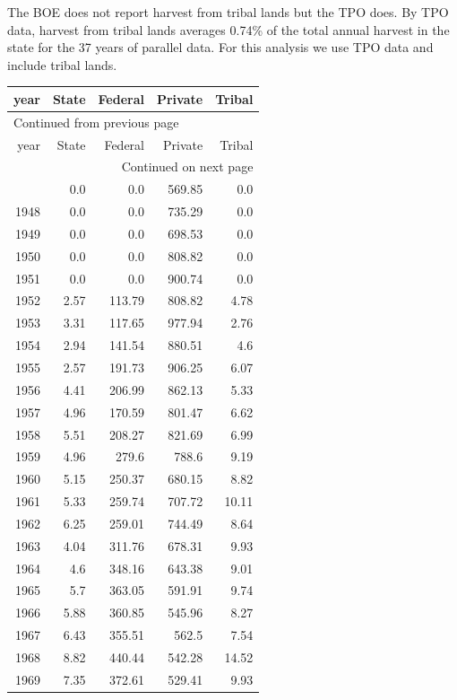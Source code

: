 \documentclass[a4paper]{article}
\begin{document}
The BOE does not report harvest from tribal lands but the TPO does. By
TPO data, harvest from tribal lands averages 0.74\% of the total
annual harvest in the state for the 37 years of parallel data. For
this analysis we use TPO data and include tribal lands. 


\begin{longtable}{rrrrr}
year & State & Federal & Private & Tribal\\
\hline
\endfirsthead
\multicolumn{5}{l}{Continued from previous page} \\
\hline

year & State & Federal & Private & Tribal \\

\hline
\endhead
\hline\multicolumn{5}{r}{Continued on next page} \\
\endfoot
\endlastfoot
\hline
1947 & 0.0 & 0.0 & 569.85 & 0.0\\
1948 & 0.0 & 0.0 & 735.29 & 0.0\\
1949 & 0.0 & 0.0 & 698.53 & 0.0\\
1950 & 0.0 & 0.0 & 808.82 & 0.0\\
1951 & 0.0 & 0.0 & 900.74 & 0.0\\
1952 & 2.57 & 113.79 & 808.82 & 4.78\\
1953 & 3.31 & 117.65 & 977.94 & 2.76\\
1954 & 2.94 & 141.54 & 880.51 & 4.6\\
1955 & 2.57 & 191.73 & 906.25 & 6.07\\
1956 & 4.41 & 206.99 & 862.13 & 5.33\\
1957 & 4.96 & 170.59 & 801.47 & 6.62\\
1958 & 5.51 & 208.27 & 821.69 & 6.99\\
1959 & 4.96 & 279.6 & 788.6 & 9.19\\
1960 & 5.15 & 250.37 & 680.15 & 8.82\\
1961 & 5.33 & 259.74 & 707.72 & 10.11\\
1962 & 6.25 & 259.01 & 744.49 & 8.64\\
1963 & 4.04 & 311.76 & 678.31 & 9.93\\
1964 & 4.6 & 348.16 & 643.38 & 9.01\\
1965 & 5.7 & 363.05 & 591.91 & 9.74\\
1966 & 5.88 & 360.85 & 545.96 & 8.27\\
1967 & 6.43 & 355.51 & 562.5 & 7.54\\
1968 & 8.82 & 440.44 & 542.28 & 14.52\\
1969 & 7.35 & 372.61 & 529.41 & 9.93\\

\end{longtable}
\end{document}
